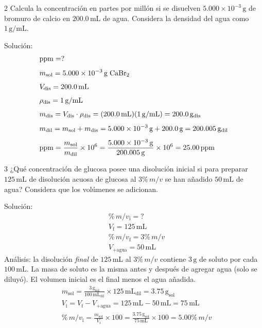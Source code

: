 \begin{exercise}{2}{}
Calcula la concentración en partes por millón si se disuelven $5.000\times10^{-3}\,\mathrm{g}$ de bromuro de calcio en $200.0\,\mathrm{mL}$ de agua. Considera la densidad del agua como $1\,\mathrm{g/mL}$.

Solución:
\begin{align*}
    &\mathrm{ppm} = ? \\[4pt]
    &m_{\mathrm{sol}} = 5.000\times10^{-3}\,\mathrm{g}\;\ce{CaBr2} \\[4pt]
    &V_{\mathrm{dis}} = 200.0\,\mathrm{mL} \\[4pt]
    &\rho_{\mathrm{dis}} = 1\,\mathrm{g/mL} \\[4pt]
    &m_{\mathrm{dis}} = V_{\mathrm{dis}} \cdot \rho_{\mathrm{dis}}
        = (200.0\,\mathrm{mL})(1\,\mathrm{g/mL})
        = 200.0\,\mathrm{g}_{\mathrm{dis}} \\[4pt]
    &m_{\mathrm{dil}} = m_{\mathrm{sol}} + m_{\mathrm{dis}}
        = 5.000\times10^{-3}\,\mathrm{g} + 200.0\,\mathrm{g}
        = 200.005\,\mathrm{g}_{\mathrm{dil}} \\[4pt]
    &\mathrm{ppm} = \frac{m_{\mathrm{sol}}}{m_{\mathrm{dil}}} \times 10^6
        = \frac{5.000\times10^{-3}\,\mathrm{g}}{200.005\,\mathrm{g}} \times 10^6
        = 25.00\,\mathrm{ppm}
\end{align*}
\end{exercise}

\begin{exercise}{3}{}
¿Qué concentración de glucosa posee una disolución inicial si para preparar $125\,\mathrm{mL}$ de disolución acuosa de glucosa al $3\%\,m/v$ se han añadido $50\,\mathrm{mL}$ de agua? Considera que los volúmenes se adicionan.

Solución:
\begin{align*}
    &\%\,m/v_{\mathrm{i}} = ? \\[4pt]
    &V_{\mathrm{f}} = 125\,\mathrm{mL} \\[4pt]
    &\%\,m/v_{\mathrm{f}} = 3\%\,m/v \\[4pt]
    &V_{\mathrm{+agua}} = 50\,\mathrm{mL}
\end{align*}
Análisis: la disolución \textit{final} de $125\,\mathrm{mL}$ al $3\%\,m/v$ contiene $3\,\mathrm{g}$ de soluto por cada $100\,\mathrm{mL}$. La masa de soluto es la misma antes y después de agregar agua (solo se diluyó). El volumen inicial es el final menos el agua añadida.
\begin{align*}
    &m_{\mathrm{sol}} = \frac{3\,\mathrm{g}_{\mathrm{sol}}}{100\,\mathrm{mL}_{\mathrm{dil}}} \times 125\,\mathrm{mL}_{\mathrm{dil}} = 3.75\,\mathrm{g}_{\mathrm{sol}} \\[4pt]
    &V_{\mathrm{i}} = V_{\mathrm{f}} - V_{\mathrm{+agua}} = 125\,\mathrm{mL} - 50\,\mathrm{mL} = 75\,\mathrm{mL} \\[4pt]
    &\%\,m/v_{\mathrm{i}} = \frac{m_{\mathrm{sol}}}{V_{\mathrm{i}}} \times 100
        = \frac{3.75\,\mathrm{g}_{\mathrm{sol}}}{75\,\mathrm{mL}} \times 100
        = 5.00\%\,m/v
\end{align*}
\end{exercise}

